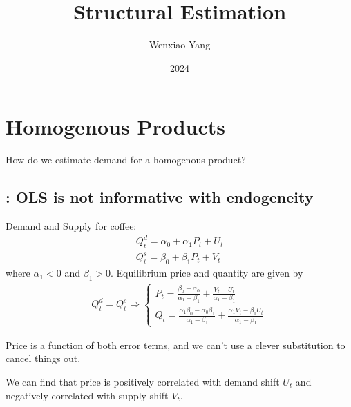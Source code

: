\documentclass[11pt]{elegantbook}
\title{Structural Estimation}
\author{Wenxiao Yang}
\institute{Haas School of Business, University of California Berkeley}
\date{2024}
\begin{document}
\maketitle

\frontmatter
\tableofcontents

\mainmatter

\chapter{Homogenous Products}
How do we estimate demand for a homogenous product?
\section{\cite{working1927statistical}: OLS is not informative with endogeneity}
Demand and Supply for coffee:
\begin{equation}
    \begin{aligned}
        Q^d_t=\alpha_0+\alpha_1 P_t+U_t\\
        Q^s_t=\beta_0+\beta_1 P_t+V_t
    \end{aligned}
    \nonumber
\end{equation}
where $\alpha_1<0$ and $\beta_1>0$. Equilibrium price and quantity are given by
\begin{equation}
    \begin{aligned}
        Q^d_t=Q^s_t \Rightarrow \left\{\begin{matrix}
            P_t=\frac{\beta_0-\alpha_0}{\alpha_1-\beta_1}+\frac{V_t-U_t}{\alpha_1-\beta_1}\\
            Q_t=\frac{\alpha_1\beta_0-\alpha_0\beta_1}{\alpha_1-\beta_1}+\frac{\alpha_1V_t-\beta_1U_t}{\alpha_1-\beta_1}
        \end{matrix}\right.
    \end{aligned}
    \nonumber
\end{equation}
\begin{note}
    Price is a function of both error terms, and we can't use a clever substitution to cancel things out.
\end{note}
We can find that price is positively correlated with demand shift $U_t$ and negatively correlated with supply shift $V_t$.
\end{document}

